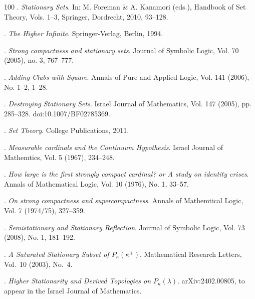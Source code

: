 \documentclass[a4paper,12pt,reqno,oneside]{amsart}
\theoremstyle{plain}
\begin{document}
\begin{thebibliography}{100}
. 
\emph{Stationary Sets}. 
In: M. Foreman \& A. Kanamori (eds.), Handbook of Set Theory, 
Vols. 1–3, Springer, Dordrecht, 2010, 93--128.

. 
\emph{The Higher Infinite}. 
Springer-Verlag, Berlin, 1994.

.
\emph{Strong compactness and stationary sets}.
Journal of Symbolic Logic, Vol. 70 (2005), no. 3, 767--777.

. 
\emph{Adding Clubs with Square}. 
Annals of Pure and Applied Logic, Vol. 141 (2006), No. 1–2, 1--28.

. 
\emph{Destroying Stationary Sets}. 
Israel Journal of Mathematics, Vol. 147 (2005), pp. 285–328. 
doi:10.1007/BF02785369.

.
\emph{Set Theory}.
College Publications, 2011.

.
\emph{Measurable cardinals and the Continuum Hypothesis}.
Israel Journal of Mathemtics, Vol. 5 (1967), 234--248.

.
\emph{How large is the first strongly compact cardinal? or
A study on identity crises}.
Annals of Mathematical Logic, Vol. 10 (1976), No. 1, 33--57.

.
\emph{On strong compactness and supercompactness}.
Annals of Mathemtical Logic, Vol. 7 (1974/75), 327--359.

. 
\emph{Semistationary and Stationary Reflection}. 
Journal of Symbolic Logic, Vol. 73 (2008), No. 1, 181--192.

. 
\emph{A Saturated Stationary Subset of \(P_\kappa(\kappa^+)\)}. 
Mathematical Research Letters, Vol.~10 (2003), No.~4.

. 
\emph{Higher Stationarity and Derived Topologies on \(P_\kappa(\lambda)\)}. 
arXiv:2402.00805, to appear in the Israel Journal of Mathematics.


\end{thebibliography}
\end{document}
